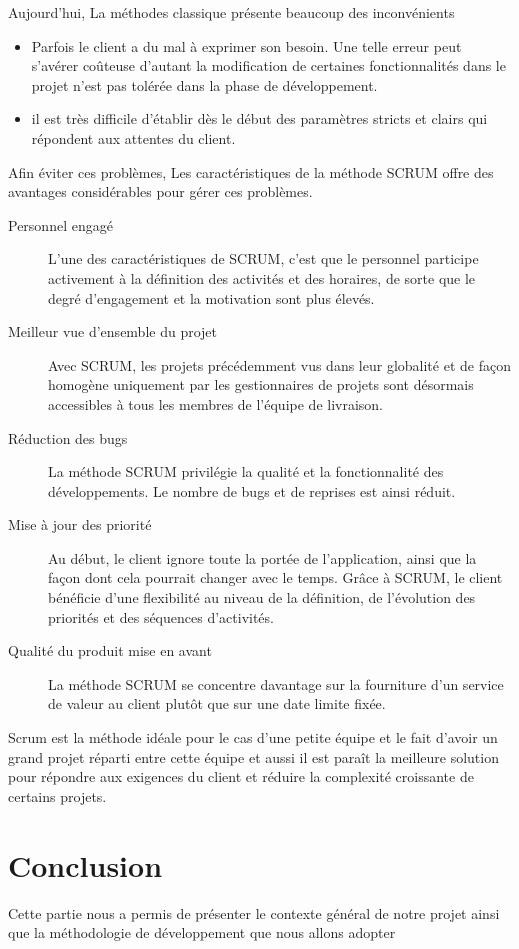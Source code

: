 Aujourd'hui, La méthodes classique présente beaucoup des inconvénients 
\begin{itemize}
 \item Parfois le client a
du mal à exprimer son besoin. Une telle erreur peut s'avérer 
coûteuse d'autant la modification
de certaines fonctionnalités dans le projet n'est pas
tolérée dans la phase de développement.
 \item il est très difficile d'établir dès
le début des paramètres stricts et clairs qui répondent aux attentes du client.
\end{itemize}
Afin éviter ces problèmes, Les caractéristiques de la méthode SCRUM offre
des avantages considérables pour gérer ces problèmes.
\begin{description}
 \item [Personnel engagé] L'une des caractéristiques de SCRUM, 
 c'est que le personnel participe activement à la définition des activités et
 des horaires, de sorte que le degré d'engagement et la motivation sont plus élevés.
 \item [Meilleur vue d'ensemble du projet] Avec SCRUM, les projets 
 précédemment vus dans leur globalité et de façon homogène uniquement par
 les gestionnaires de projets sont désormais accessibles à tous les membres de
 l'équipe de livraison.
 \item [Réduction des bugs] La méthode SCRUM privilégie la qualité et la
 fonctionnalité des développements. Le nombre de bugs et
 de reprises est ainsi réduit.
 \item [Mise à jour des priorité] Au début, le client ignore toute 
 la portée de l'application, ainsi que la façon dont cela pourrait changer avec 
 le temps. Grâce à SCRUM, le client bénéficie d'une flexibilité 
 au niveau de la définition, de l'évolution des priorités et des séquences d'activités.
 \item [Qualité du produit mise en avant] La méthode SCRUM se concentre davantage 
 sur la fourniture d'un service de valeur au client plutôt que sur 
 une date limite fixée.
\end{description}

Scrum est la méthode idéale pour le cas d'une petite équipe et le fait d'avoir un grand 
projet réparti entre cette équipe et aussi il est paraît la meilleure solution pour 
répondre aux exigences du client et réduire la complexité croissante de 
certains projets.

\section{Conclusion}

Cette partie nous a permis de présenter le contexte général de notre projet ainsi que la
méthodologie de développement que nous allons adopter
